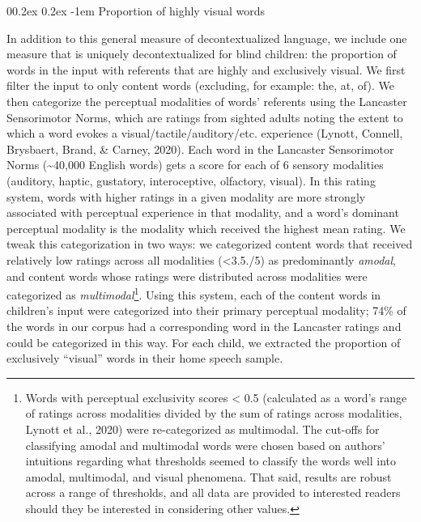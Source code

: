 \documentclass[
  man]{apa6}
\makeatletter
\let\oldparagraph\paragraph
\renewcommand{\paragraph}[1]{\oldparagraph{#1}\mbox{}}
\renewcommand{\paragraph}{\@startsection{paragraph}{4}{\parindent}%
  {0\baselineskip \@plus 0.2ex \@minus 0.2ex}%
  {-1em}%
  {\normalfont\normalsize\bfseries\itshape\typesectitle}}
\makeatother
\begin{document}
\hypertarget{proportion-of-highly-visual-words}{%
\paragraph{Proportion of highly visual words}\label{proportion-of-highly-visual-words}}

In addition to this general measure of decontextualized language, we include one measure that is uniquely decontextualized for blind children: the proportion of words in the input with referents that are highly and exclusively visual. We first filter the input to only content words (excluding, for example: the, at, of). We then categorize the perceptual modalities of words' referents using the Lancaster Sensorimotor Norms, which are ratings from sighted adults noting the extent to which a word evokes a visual/tactile/auditory/etc. experience (Lynott, Connell, Brysbaert, Brand, \& Carney, 2020). Each word in the Lancaster Sensorimotor Norms (\textasciitilde40,000 English words) gets a score for each of 6 sensory modalities (auditory, haptic, gustatory, interoceptive, olfactory, visual). In this rating system, words with higher ratings in a given modality are more strongly associated with perceptual experience in that modality, and a word's dominant perceptual modality is the modality which received the highest mean rating. We tweak this categorization in two ways: we categorized content words that received relatively low ratings across all modalities (\textless3.5./5) as predominantly \emph{amodal}, and content words whose ratings were distributed across modalities were categorized as \emph{multimodal}\footnote{Words with perceptual exclusivity scores \textless{} 0.5 (calculated as a word's range of ratings across modalities divided by the sum of ratings across modalities, Lynott et al., 2020) were re-categorized as multimodal. The cut-offs for classifying amodal and multimodal words were chosen based on authors' intuitions regarding what thresholds seemed to classify the words well into amodal, multimodal, and visual phenomena. That said, results are robust across a range of thresholds, and all data are provided to interested readers should they be interested in considering other values.
}. Using this system, each of the content words in children's input were categorized into their primary perceptual modality; 74\% of the words in our corpus had a corresponding word in the Lancaster ratings and could be categorized in this way. For each child, we extracted the proportion of exclusively ``visual'' words in their home speech sample.
\end{document}
